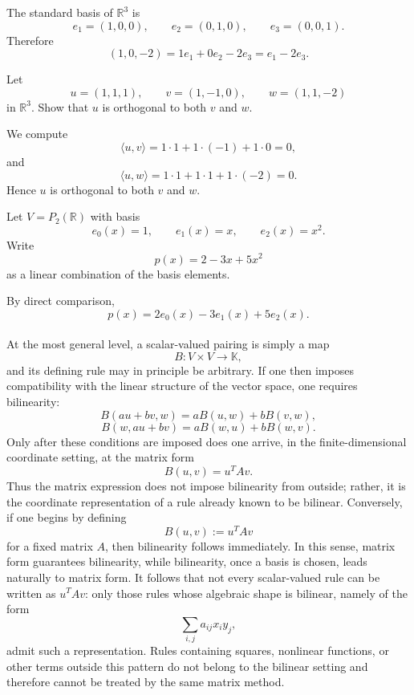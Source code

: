 \documentclass{article}
\begin{document}
	\begin{solution}
		The standard basis of $\mathbb{R}^3$ is
		$$
		e_1=(1,0,0),\qquad e_2=(0,1,0),\qquad e_3=(0,0,1).
		$$
		Therefore
		$$
		(1,0,-2)=1e_1+0e_2-2e_3=e_1-2e_3.
		$$
	\end{solution}
	
	\begin{exercise}
		Let
		$$
		u=(1,1,1),\qquad v=(1,-1,0),\qquad w=(1,1,-2)
		$$
		in $\mathbb{R}^3$. Show that $u$ is orthogonal to both $v$ and $w$.
	\end{exercise}
	
	\begin{solution}
		We compute
		$$
		\langle u,v\rangle=1\cdot 1+1\cdot(-1)+1\cdot 0=0,
		$$
		and
		$$
		\langle u,w\rangle=1\cdot 1+1\cdot 1+1\cdot(-2)=0.
		$$
		Hence $u$ is orthogonal to both $v$ and $w$.
	\end{solution}
	
	\begin{exercise}
		Let $V=P_2(\mathbb{R})$ with basis
		$$
		e_0(x)=1,\qquad e_1(x)=x,\qquad e_2(x)=x^2.
		$$
		Write
		$$
		p(x)=2-3x+5x^2
		$$
		as a linear combination of the basis elements.
	\end{exercise}
	
	\begin{solution}
		By direct comparison,
		$$
		p(x)=2e_0(x)-3e_1(x)+5e_2(x).
		$$
	\end{solution}
	
	\paragraph{}
	At the most general level, a scalar-valued pairing is simply a map
	$$
	B:V\times V\to \mathbb{K},
	$$
	and its defining rule may in principle be arbitrary. If one then imposes compatibility with the linear structure of the vector space, one requires bilinearity:
	$$
	B(au+bv,w)=aB(u,w)+bB(v,w),
	$$
	$$
	B(w,au+bv)=aB(w,u)+bB(w,v).
	$$
	Only after these conditions are imposed does one arrive, in the finite-dimensional coordinate setting, at the matrix form
	$$
	B(u,v)=u^TAv.
	$$
	Thus the matrix expression does not impose bilinearity from outside; rather, it is the coordinate representation of a rule already known to be bilinear. Conversely, if one begins by defining
	$$
	B(u,v):=u^TAv
	$$
	for a fixed matrix $A$, then bilinearity follows immediately. In this sense, matrix form guarantees bilinearity, while bilinearity, once a basis is chosen, leads naturally to matrix form. It follows that not every scalar-valued rule can be written as $u^TAv$: only those rules whose algebraic shape is bilinear, namely of the form
	$$
	\sum_{i,j} a_{ij}x_i y_j,
	$$
	admit such a representation. Rules containing squares, nonlinear functions, or other terms outside this pattern do not belong to the bilinear setting and therefore cannot be treated by the same matrix method.
	
\end{document}

